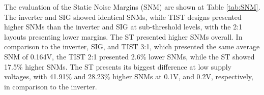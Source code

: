 \documentclass[pgmicro,mestrado,english]{iiufrgs}
\begin{document}
    The evaluation of the Static Noise Margins (SNM) are shown at Table \ref{tab:SNM}. The inverter and SIG showed identical SNMs, while TIST designs presented higher SNMs than the inverter and SIG at sub-threshold levels, with the 2:1 layouts presenting lower margins. The ST presented higher SNMs overall. In comparison to the inverter, SIG, and TIST 3:1, which presented the same average SNM of 0.164V, the TIST 2:1 presented 2.6\% lower SNMs, while the ST showed 17.5\% higher SNMs. The ST presents its biggest difference at low supply voltages, with 41.91\% and 28.23\% higher SNMs at 0.1V, and 0.2V, respectively, in comparison to the inverter. 
    
\begin{table}[]
\centering
\caption{}
\label{tab:SNM}
\end{table}
\end{document}
